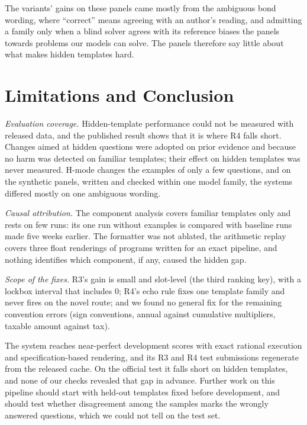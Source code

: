 \documentclass[conference]{IEEEtran}
\begin{document}
The variants' gains on these panels came mostly from the ambiguous bond wording, where ``correct'' means agreeing with an author's reading, and admitting a family only when a blind solver agrees with its reference biases the panels towards problems our models can solve. The panels therefore say little about what makes hidden templates hard.

\section{Limitations and Conclusion}
\emph{Evaluation coverage.} Hidden-template performance could not be measured with released data, and the published result shows that it is where R4 falls short. Changes aimed at hidden questions were adopted on prior evidence and because no harm was detected on familiar templates; their effect on hidden templates was never measured. H-mode changes the examples of only a few questions, and on the synthetic panels, written and checked within one model family, the systems differed mostly on one ambiguous wording.

\emph{Causal attribution.} The component analysis covers familiar templates only and rests on few runs: its one run without examples is compared with baseline runs made five weeks earlier. The formatter was not ablated, the arithmetic replay covers three float renderings of programs written for an exact pipeline, and nothing identifies which component, if any, caused the hidden gap.

\emph{Scope of the fixes.} R3's gain is small and slot-level (the third ranking key), with a lockbox interval that includes 0; R4's echo rule fixes one template family and never fires on the novel route; and we found no general fix for the remaining convention errors (sign conventions, annual against cumulative multipliers, taxable amount against tax).

The system reaches near-perfect development scores with exact rational execution and specification-based rendering, and its R3 and R4 test submissions regenerate from the released cache. On the official test it falls short on hidden templates, and none of our checks revealed that gap in advance. Further work on this pipeline should start with held-out templates fixed before development, and should test whether disagreement among the samples marks the wrongly answered questions, which we could not tell on the test set.
\end{document}
